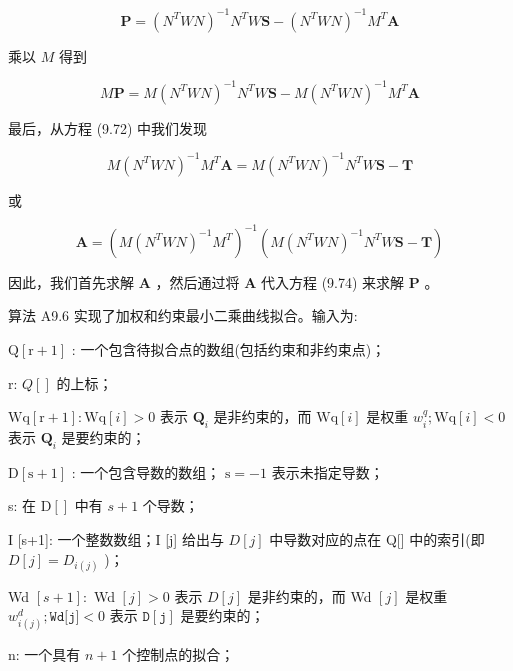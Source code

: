 \documentclass[../main.tex]{subfiles}
\begin{document}
\[
\mathbf{P} = {\left( {N}^{T}WN\right) }^{-1}{N}^{T}W\mathbf{S} - {\left( {N}^{T}WN\right) }^{-1}{M}^{T}\mathbf{A} \tag{9.74}
\]

乘以 \(M\) 得到

\[
M\mathbf{P} = M{\left( {N}^{T}WN\right) }^{-1}{N}^{T}W\mathbf{S} - M{\left( {N}^{T}WN\right) }^{-1}{M}^{T}\mathbf{A}
\]

最后，从方程 (9.72) 中我们发现

\[
M{\left( {N}^{T}WN\right) }^{-1}{M}^{T}\mathbf{A} = M{\left( {N}^{T}WN\right) }^{-1}{N}^{T}W\mathbf{S} - \mathbf{T} \tag{9.75}
\]

或

\[
\mathbf{A} = {\left( M{\left( {N}^{T}WN\right) }^{-1}{M}^{T}\right) }^{-1}\left( {M{\left( {N}^{T}WN\right) }^{-1}{N}^{T}W\mathbf{S} - \mathbf{T}}\right)  \tag{9.76}
\]

因此，我们首先求解 \(\mathbf{A}\) ，然后通过将 \(\mathbf{A}\) 代入方程 (9.74) 来求解 \(\mathbf{P}\) 。

算法 A9.6 实现了加权和约束最小二乘曲线拟合。输入为:

\(\mathrm{Q}\left\lbrack  {\mathrm{r} + 1}\right\rbrack\) : 一个包含待拟合点的数组(包括约束和非约束点)；

r: \(Q\left\lbrack  \right\rbrack\) 的上标；

\(\mathrm{{Wq}}\left\lbrack  {\mathrm{r} + 1}\right\rbrack   : \mathrm{{Wq}}\left\lbrack  i\right\rbrack   > 0\) 表示 \({\mathbf{Q}}_{i}\) 是非约束的，而 \(\mathrm{{Wq}}\left\lbrack  i\right\rbrack\) 是权重 \({w}_{i}^{q};\mathrm{{Wq}}\left\lbrack  i\right\rbrack   < 0\) 表示 \({\mathbf{Q}}_{i}\) 是要约束的；

\(\mathrm{D}\left\lbrack  {\mathrm{s} + 1}\right\rbrack\) : 一个包含导数的数组； \(\mathrm{s} =  - 1\) 表示未指定导数；

s: 在 \(\mathrm{D}\left\lbrack  \right\rbrack\) 中有 \(s + 1\) 个导数；

I [s+1]: 一个整数数组；I [j] 给出与 \(D\left\lbrack  j\right\rbrack\) 中导数对应的点在 Q[] 中的索引(即 \(D\left\lbrack  j\right\rbrack   = {D}_{i\left( j\right) }\) )；

Wd \(\left\lbrack  {s + 1}\right\rbrack   :\) Wd \(\left\lbrack  j\right\rbrack   > 0\) 表示 \(D\left\lbrack  j\right\rbrack\) 是非约束的，而 Wd \(\left\lbrack  j\right\rbrack\) 是权重 \({w}_{i\left( j\right) }^{d};\texttt{Wd[j]} < 0\) 表示 \(\mathtt{D\left\lbrack  j\right\rbrack  }\) 是要约束的；

n: 一个具有 \(n + 1\) 个控制点的拟合；
\end{document}
